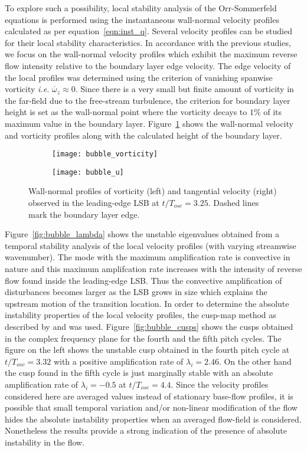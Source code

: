 To explore such a possibility, local stability analysis of the Orr-Sommerfeld equations \citep{schmid01} is performed using the instantaneous wall-normal velocity profiles calculated as per equation~\ref{eqn:inst_q}. Several velocity profiles can be studied for their local stability characteristics. In accordance with the previous studies, we focus on the wall-normal velocity profiles which exhibit the maximum reverse flow intensity relative to the boundary layer edge velocity. The edge velocity of the local profiles was determined using the criterion of vanishing spanwise vorticity \textit{i.e.} $\overline{\omega}_{z}\approx0$. Since there is a very small but finite amount of vorticity in the far-field due to the free-stream turbulence, the criterion for boundary layer height is set as the wall-normal point where the vorticity decays to $1\%$ of its maximum value in the boundary layer. Figure~\ref{fig:bubble_profiles} shows the wall-normal velocity and vorticity profiles along with the calculated height of the boundary layer.
\begin{figure}
	\centering
	\begin{subfigure}[t]{0.48\textwidth}
		\centering
		\texttt{[image: bubble\_vorticity]}
	\end{subfigure}
	\begin{subfigure}[t]{0.48\textwidth}
		\centering
		\texttt{[image: bubble\_u]}
	\end{subfigure}
	\caption{Wall-normal profiles of vorticity (left) and tangential velocity (right) observed in the leading-edge LSB at $t/T_{osc}=3.25$. Dashed lines mark the boundary layer edge.}
	\label{fig:bubble_profiles}
\end{figure}

Figure~\ref{fig:bubble_lambda} shows the unstable eigenvalues obtained from a temporal stability analysis of the local velocity profiles (with varying streamwise wavenumber). The mode with the maximum amplification rate is convective in nature and this maximum amplifcation rate increases with the intensity of reverse flow found inside the leading-edge LSB. Thus the convective amplification of disturbances becomes larger as the LSB grows in size which explains the upstream motion of the transition location. In order to determine the absolute instability properties of the local velocity profiles, the cusp-map method as described by \cite{schmid01} and \cite{kupfer87} was used. Figure~\ref{fig:bubble_cusps} shows the cusps obtained in the complex frequency plane for the fourth and the fifth pitch cycles. The figure on the left shows the unstable cusp obtained in the fourth pitch cycle at $t/T_{osc}=3.32$ with a positive amplification rate of $\lambda_{i}=2.46$. On the other hand the cusp found in the fifth cycle is just marginally stable with an absolute amplification rate of $\lambda_{i}=-0.5$ at $t/T_{osc}=4.4$. Since the velocity profiles considered here are averaged values instead of stationary base-flow profiles, it is possible that small temporal variation and/or non-linear modification of the flow hides the absolute instability properties when an averaged flow-field is considered. Nonetheless the results provide a strong indication of the presence of absolute instability in the flow. 

